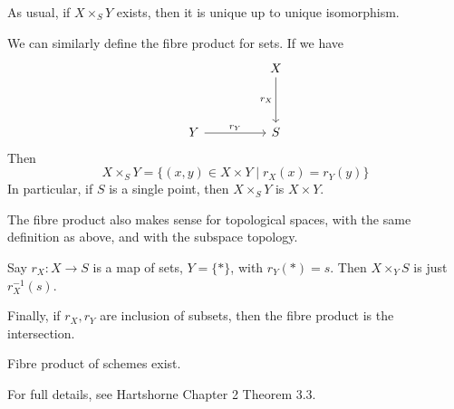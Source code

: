 \documentclass{article}
\begin{document}
As usual, if \(X \times_S Y\) exists, then it is unique up to unique isomorphism.

\begin{remark}
    We can similarly define the fibre product for sets. If we have
\[\begin{tikzcd}
	&& X \\
	\\
	Y && S
	\arrow["{r_Y}", from=3-1, to=3-3]
	\arrow["{r_X}"', from=1-3, to=3-3]
\end{tikzcd}\]
    Then
    \[X \times_S Y = \{(x, y) \in X \times Y \mid r_X(x) = r_Y(y)\}\]
    In particular, if \(S\) is a single point, then \(X \times_S Y\) is \(X \times Y\).

    The fibre product also makes sense for topological spaces, with the same definition as above, and with the subspace topology.

    Say \(r_X : X \to S\) is a map of sets, \(Y = \{*\}\), with \(r_Y(*) = s\). Then \(X \times_Y S\) is just \(r_X^{-1}(s)\).

    Finally, if \(r_X, r_Y\) are inclusion of subsets, then the fibre product is the intersection.
\end{remark}

\begin{theorem}
    Fibre product of schemes exist.
\end{theorem}

For full details, see Hartshorne Chapter 2 Theorem 3.3.
\end{document}
